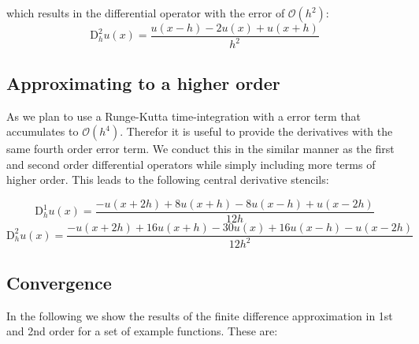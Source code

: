 which results in the differential operator with the error of $\mathcal{O}(h^2)$:
\begin{equation}
  \mathrm{D}^2_h u(x) = \frac{u(x-h) - 2 u(x) + u(x+h)}{h^2}
\end{equation}

\subsection{Approximating to a higher order}
As we plan to use a Runge-Kutta time-integration with a error term that accumulates to $\mathcal{O}(h^4)$. Therefor it is useful to provide the derivatives with the same fourth order error term. We conduct this in the similar manner as the first and second order differential operators while simply including more terms of higher order. This leads to the following central derivative stencils:

\begin{equation}
  \mathrm{D}^1_h u(x) = \frac{-u(x+2h)+8u(x + h) - 8u(x - h)+ u(x-2h)}{12h}
\end{equation}
\begin{equation}
  \mathrm{D}^2_h u(x) = \frac{-u(x+2h) + 16u(x+h) - 30u(x) + 16u(x-h) - u(x-2h)}{12h^2}
\end{equation}

\subsection{Convergence}
In the following we show the results of the finite difference approximation in 1st and 2nd order for a set of example functions. These are:


